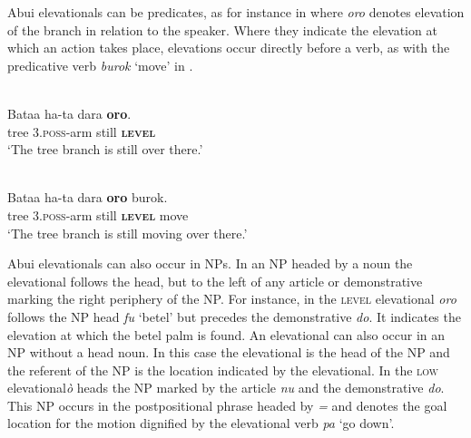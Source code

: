 

Abui elevationals can be predicates, as for instance in  where \textit{oro} denotes elevation of the branch in relation to the speaker. Where they indicate the elevation at which an action takes place, elevations occur directly before a verb, as with the predicative verb \textit{burok} `move' in .



\ea%
\label{ex:7:9}
 \\
\gll  Bataa   ha-ta{\ng} dara  \textbf{oro}. \\
       tree  3.\textsc{poss}{}-arm   still  \textbf{\textsc{level}} \\
\glt `The tree branch is still over there.'
\z



 

\ea
\label{ex:7:10}
 \\
\gll Bataa   ha-ta{\ng} dara \textbf{oro} burok.  \\
tree  3.\textsc{poss}{}-arm   still  \textbf{\textsc{level}} move  \\
\glt   `The tree branch is still moving over there.'  
\z


 

  



Abui elevationals can also occur in NPs. In an NP headed by a noun the elevational follows the head, but to the left of any article or demonstrative marking the right periphery of the NP. For instance, in  the \textsc{level} elevational \textit{oro} follows the NP head \textit{fu} `betel' but precedes the demonstrative \textit{do}. It indicates the elevation at which the betel palm is found. An elevational can also occur in an NP without a head noun. In this case the elevational is the head of the NP and the referent of the NP is the location indicated by the elevational. In  the \textsc{low} elevational\textit ò heads the NP marked by the article \textit{nu} and the demonstrative \textit{do}. This NP occurs in the postpositional phrase headed by \textit{={\ng}} and denotes the goal location for the motion dignified by the elevational verb \textit{pa} `go down'.




